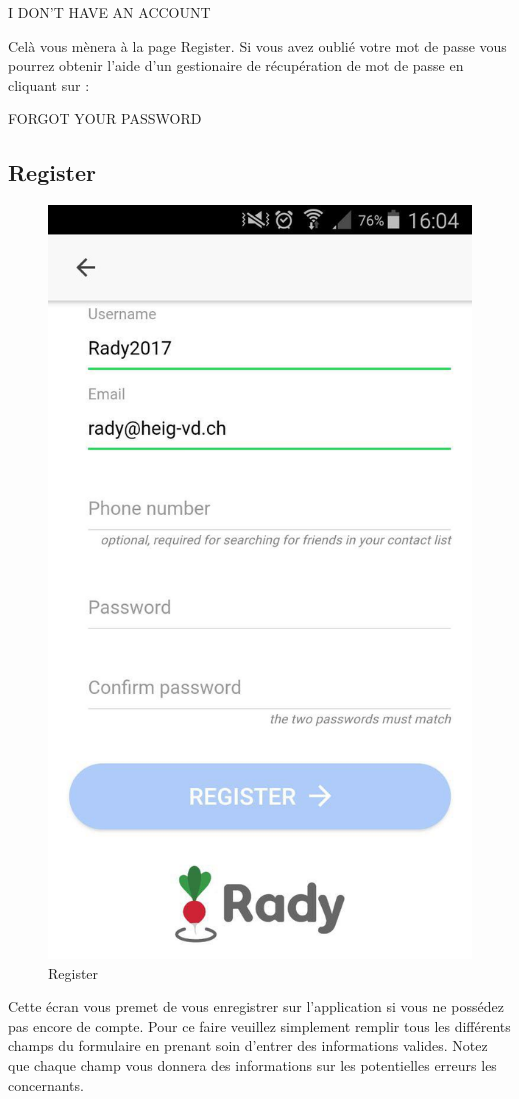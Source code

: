 \documentclass[french]{article}
\begin{document}
	\centering
	I DON'T HAVE AN ACCOUNT
	
	\bigskip
	\justifying 
	Celà vous mènera à la page Register.
	\newline
	Si vous avez oublié votre mot de passe vous pourrez obtenir l'aide d'un gestionaire de récupération de mot de passe en cliquant sur :
	\bigskip
	
	\centering
	FORGOT YOUR PASSWORD
	
	\bigskip
	\justifying 
	\subsection{Register}
	\begin{figure}[H]
		\centering
		\includegraphics[scale=0.4]{../screenshot/screenshot-register2}
		\caption{Register}
		\label{Register}
	\end{figure} 
	Cette écran vous premet de vous enregistrer sur l'application si vous ne possédez pas encore de compte. Pour ce faire veuillez simplement remplir tous les différents champs du formulaire en prenant soin d'entrer des informations valides. Notez que chaque champ vous donnera des informations sur les potentielles erreurs les concernants.
	
\end{document}
